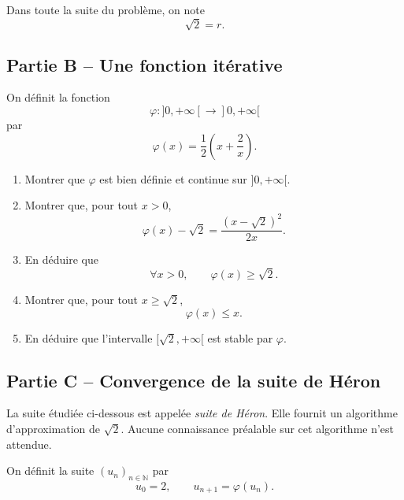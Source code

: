 \documentclass[11pt,a4paper]{article}
\newcommand{\N}{\mathbb{N}}
\begin{document}
Dans toute la suite du problème, on note
\[
\sqrt{2}=r.
\]


\subsection*{Partie B -- Une fonction itérative}

On définit la fonction
\[
\varphi : ]0,+\infty[ \longrightarrow ]0,+\infty[
\]
par
\[
\varphi(x)=\frac12\left(x+\frac{2}{x}\right).
\]

\begin{enumerate}[resume]
    \item Montrer que \(\varphi\) est bien définie et continue sur \(]0,+\infty[\).

    \item Montrer que, pour tout \(x>0\),
    \[
    \varphi(x)-\sqrt{2}
    =
    \frac{(x-\sqrt{2})^2}{2x}.
    \]

    \item En déduire que
    \[
    \forall x>0,\qquad \varphi(x)\geq \sqrt{2}.
    \]

    \item Montrer que, pour tout \(x\geq \sqrt{2}\),
    \[
    \varphi(x)\leq x.
    \]

    \item En déduire que l'intervalle \([\sqrt{2},+\infty[\) est stable par \(\varphi\).
\end{enumerate}


\subsection*{Partie C -- Convergence de la suite de Héron}

\begin{notionbox}
La suite étudiée ci-dessous est appelée \emph{suite de Héron}. Elle fournit un algorithme d'approximation de \(\sqrt{2}\). Aucune connaissance préalable sur cet algorithme n'est attendue.
\end{notionbox}

On définit la suite \((u_n)_{n\in\N}\) par
\[
u_0=2,
\qquad
u_{n+1}=\varphi(u_n).
\]
\end{document}
